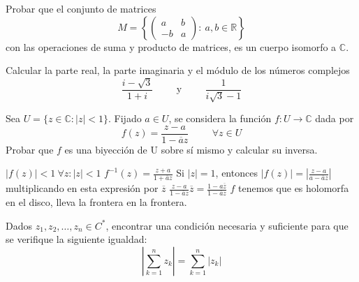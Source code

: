 \begin{ejer}
	Probar que el conjunto de matrices
	$$ M = \left\{ 
	\left( \begin{array}{cc}
	 a & b \\
	-b & a \end{array} \right)
	: \ a, b\in \mathbb{R}\right\} $$
	con las operaciones de suma y producto de matrices, es un cuerpo isomorfo a $\mathbb{C}$.
\end{ejer}


\begin{ejer}
	Calcular la parte real, la parte imaginaria y el módulo de los números complejos
	$$ \frac{i-\sqrt{3}}{1+i}\hspace{1cm}\text{y}\hspace{1cm} \frac{1}{i\sqrt{3}-1} $$
\end{ejer}



\begin{ejer}
	Sea $U=\{ z\in\mathbb{C} : |z|<1 \}$.
	Fijado $a \in U$, se considera la función $f: U\rightarrow\mathbb{C}$ dada por
	$$ f(z) = \frac{z-a}{1-\overline{a}z}\hspace{1cm} \forall z\in U $$
	Probar que $f$ es una biyección de U sobre sí mismo y calcular su inversa.
\end{ejer}

\begin{sol}

$|f(z)| < 1 \ \forall z : |z| <1$
$f^{-1}(z)= \frac{z+a}{1+\overline{a}z}$
Si $|z|=1$, entonces $|f(z)| = |\frac{z-a}{a-\overline{a}z}|$
multiplicando en esta expresión por $\overline{z}$
$ \frac{z-a}{1-\overline{a}z} \overline{z}  =  \frac{1-a\overline{z}}{1-\overline{a}z}$
$f$ tenemos que es holomorfa en el disco, lleva la frontera en la frontera.
\end{sol}


\begin{ejer}
	Dados $z_1, z_2, \ldots , z_n \in C^{\ast}$, encontrar una condición necesaria y suficiente para que se verifique la siguiente igualdad:
	$$ \left|\sum_{k=1}^n z_k\right| = \sum_{k=1}^n |z_k|$$
\end{ejer}


